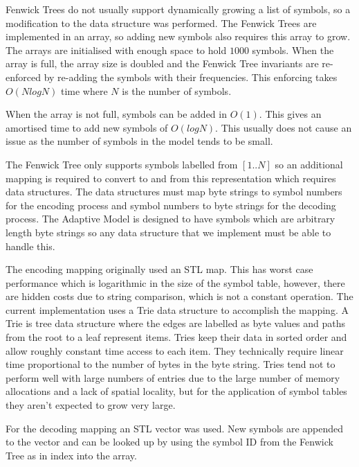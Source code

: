 \documentclass[a4paper,11pt]{report}
\begin{document}
Fenwick Trees do not usually support dynamically growing a list of symbols, so a modification to the data structure was performed. The Fenwick Trees are implemented in an array, so adding new symbols also requires this array to grow. The arrays are initialised with enough space to hold $1000$ symbols. When the array is full, the array size is doubled and the Fenwick Tree invariants are re-enforced by re-adding the symbols with their frequencies. This enforcing takes $O(NlogN)$ time where $N$ is the number of symbols. 

When the array is not full, symbols can be added in $O(1)$. This gives an amortised time to add new symbols of $O(logN)$. This usually does not cause an issue as the number of symbols in the model tends to be small.

The Fenwick Tree only supports symbols labelled from $[1..N]$ so an additional mapping is required to convert to and from this representation which requires data structures. The data structures must map byte strings to symbol numbers for the encoding process and symbol numbers to byte strings for the decoding process. The Adaptive Model is designed to have symbols which are arbitrary length byte strings so any data structure that we implement must be able to handle this. 

The encoding mapping originally used an STL map. This has worst case performance which is logarithmic in the size of the symbol table, however, there are hidden costs due to string comparison, which is not a constant operation. The current implementation uses a Trie data structure to accomplish the mapping. A Trie is tree data structure where the edges are labelled as byte values and paths from the root to a leaf represent items. Tries keep their data in sorted order and allow roughly constant time access to each item. They technically require linear time proportional to the number of bytes in the byte string. Tries tend not to perform well with large numbers of entries due to the large number of memory allocations and a lack of spatial locality, but for the application of symbol tables they aren't expected to grow very large. 

For the decoding mapping an STL vector was used. New symbols are appended to the vector and can be looked up by using the symbol ID from the Fenwick Tree as in index into the array.
\end{document}
